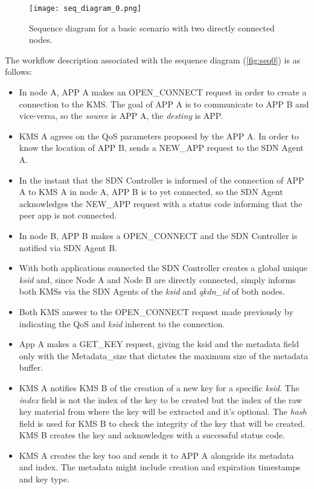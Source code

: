 \begin{refsection}
\begin{figure}[H]
	\centering
	\texttt{[image: seq\_diagram\_0.png]}
	\caption{Sequence diagram for a basic scenario with two directly connected nodes.}
	\label{fig:seq0}
\end{figure}

The workflow description associated with the sequence diagram (\autoref{fig:seq0}) is as follows:
\begin{itemize}
 	\item In node A, APP A makes an OPEN\_CONNECT request in order to create a connection to the \ac{KMS}. The goal of APP A is to communicate to APP B and vice-versa, so the \textit{source} is APP A, the \textit{destiny} is APP. 
 	\item \ac{KMS} A agrees on the QoS parameters proposed by the APP A. In order to know the location of APP B, sends a NEW\_APP request to the SDN Agent A.
 	\item In the instant that the SDN Controller is informed of the connection of APP A to KMS A in node A, APP B is to yet connected, so the SDN Agent acknowledges the NEW\_APP request  with a status code informing that the peer app is not connected.
 	\item In node B, APP B makes a OPEN\_CONNECT and the SDN Controller is notified via SDN Agent B.
 	\item With both applications connected the SDN Controller creates a global unique \textit{ksid} and, since Node A and Node B are directly connected, simply informs both \ac{KMS}s via the SDN Agents of the \textit{ksid} and \textit{qkdn\_id} of both nodes.
 	\item Both \ac{KMS} answer to the OPEN\_CONNECT request made previously by indicating the QoS and \textit{ksid} inherent to the connection.
 	\item App A makes a GET\_KEY request, giving the ksid and the metadata field only with the Metadata\_size that dictates the maximum size of the metadata buffer.
 	\item KMS A notifies KMS B of the creation of a new key for a specific \textit{ksid}. The \textit{index} field is not the index of the key to be created but the index of the raw key material from where the key will be extracted and it's optional. The \textit{hash} field is used for KMS B to check the integrity of the key that will be created. KMS B creates the key and acknowledges with a successful status code.
 	\item KMS A creates the key too and sends it to APP A alongside its metadata and index. The metadata might include creation and expiration timestamps and key type.

\end{itemize}
\end{refsection}

